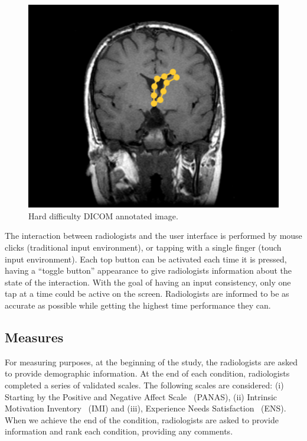 \documentclass{sigchi}
\begin{document}
\begin{figure}[!h]
\centering
\includegraphics[width=0.9\columnwidth]{screen4}
\caption{Hard difficulty DICOM annotated image.}
\label{fig:Fig6}
\end{figure}

The interaction between radiologists and the user interface is performed by mouse clicks (traditional input environment), or tapping with a single finger (touch input environment). Each top button can be activated each time it is pressed,
having a ``toggle button'' appearance to give radiologists information about the state of the interaction. With the goal of having an input consistency, only one tap at a time could be active on the screen.
Radiologists are informed to be as accurate as possible while getting the highest time performance they can.

\subsection{Measures}

For measuring purposes, at the beginning of the study, the radiologists are asked to provide demographic information. At the end of each condition, radiologists completed a series of validated scales. The following scales are considered: (i) Starting by the Positive and Negative Affect Scale~\cite{watson1999panas} (PANAS), (ii) Intrinsic Motivation Inventory~\cite{ryan1982control} (IMI) and (iii), Experience Needs Satisfaction~\cite{broeck2010capturing} (ENS). When we achieve the end of the condition, radiologists are asked to provide information and rank each condition, providing any comments.
\end{document}
